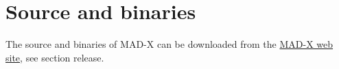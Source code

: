 
\section{Source and binaries}
\label{sec:source}

 The source and binaries of MAD-X can be downloaded from the
 \href{http://cern.ch/madx}{MAD-X web site}, see section release.   

% 
% 
% 
% 
% 
% 

